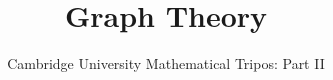 \documentclass{article}
\title{Graph Theory}
\author{Cambridge University Mathematical Tripos: Part II}
\begin{document}
\maketitle

\tableofcontentsnewpage{}

%
\end{document}
